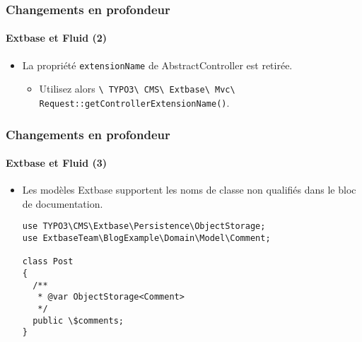 \begin{frame}[fragile]
	\frametitle{Changements en profondeur}
	\framesubtitle{Extbase et Fluid (2)}

	\begin{itemize}
		\item La propriété \texttt{extensionName} de AbstractController est retirée.

			\begin{itemize}\smaller
				\item[\ding{228}] Utilisez alors \texttt{\textbackslash
					TYPO3\textbackslash
					CMS\textbackslash
					Extbase\textbackslash
					Mvc\textbackslash
					Request::getControllerExtensionName()}.
			\end{itemize}\normalsize

	\end{itemize}

\end{frame}


\begin{frame}[fragile]
	\frametitle{Changements en profondeur}
	\framesubtitle{Extbase et Fluid (3)}

	\lstset{basicstyle=\tiny\ttfamily}

	\begin{itemize}
		\item Les modèles Extbase supportent les noms de classe non qualifiés dans le bloc de documentation.
\begin{lstlisting}
use TYPO3\CMS\Extbase\Persistence\ObjectStorage;
use ExtbaseTeam\BlogExample\Domain\Model\Comment;

class Post
{
  /**
   * @var ObjectStorage<Comment>
   */
  public \$comments;
}
\end{lstlisting}

	\end{itemize}

\end{frame}


